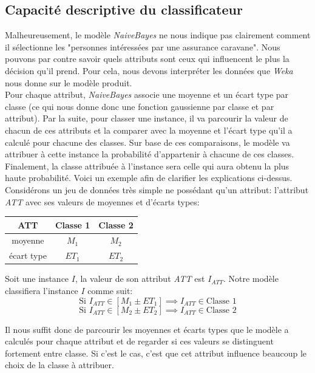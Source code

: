\documentclass[11pt,a4paper]{article}
\begin{document}
			\subsection{Capacité descriptive du classificateur}
			
				Malheureusement, le modèle \textit{NaiveBayes} ne nous indique pas clairement comment il sélectionne les "personnes intéressées par une assurance caravane". Nous pouvons par contre savoir quels attributs sont ceux qui influencent le plus la décision qu'il prend. Pour cela, nous devons interpréter les données que \textit{Weka} nous donne sur le modèle produit.\\
				
				Pour chaque attribut, \textit{NaiveBayes} associe une moyenne et un écart type par classe (ce qui nous donne donc une fonction gaussienne par classe et par attribut). Par la suite, pour classer une instance, il va parcourir la valeur de chacun de ces attributs et la comparer avec la moyenne et l'écart type qu'il a calculé pour chacune des classes. Sur base de ces comparaisons, le modèle va attribuer à cette instance la probabilité d'appartenir à chacune de ces classes. Finalement, la classe attribuée à l'instance sera celle qui aura obtenu la plus haute probabilité. Voici un exemple afin de clarifier les explications ci-dessus.\\
				
				Considérons un jeu de données très simple ne possédant qu'un attribut: l'attribut \textit{ATT} avec ses valeurs de moyennes et d'écarts types:
				\begin{center}
					\begin{tabular}{c|c c}
						ATT & Classe 1 & Classe 2 \\
						\hline
						moyenne & $M_1$ & $M_2$ \\
						écart type & $ET_1$ & $ET_2$\\
					\end{tabular}
				\end{center}
				
				Soit une instance $I$, la valeur de son attribut \textit{ATT} est $I_{ATT}$. Notre modèle classifiera l'instance $I$ comme suit:
				\[
					\text{Si } I_{ATT} \in [M_1 \pm ET_1] \implies I_{ATT} \in \text{Classe 1}
				\]
				\[
					\text{Si } I_{ATT} \in [M_2 \pm ET_2] \implies I_{ATT} \in \text{Classe 2}
				\]
				
				Il nous suffit donc de parcourir les moyennes et écarts types que le modèle a calculés pour chaque attribut et de regarder si ces valeurs se distinguent fortement entre classe. Si c'est le cas, c'est que cet attribut influence beaucoup le choix de la classe à attribuer.\\
				
\end{document}
